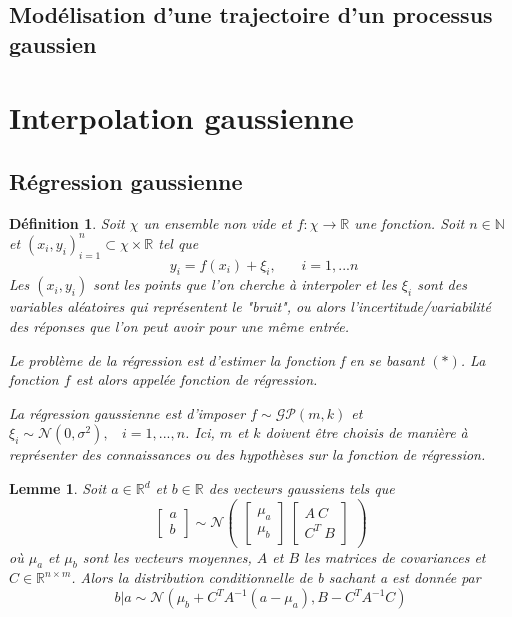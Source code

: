 \documentclass[a4paper,12pt]{article}
\newtheorem{definition}{Définition}
\newtheorem{lemma}{Lemme}
\begin{document}
\subsection{Modélisation d'une trajectoire d'un processus gaussien}

\section{Interpolation gaussienne}

\subsection{Régression gaussienne}

\begin{definition}
    Soit $\chi$ un ensemble non vide et $f:\chi\to\mathbb{R}$ une fonction.
    Soit $n\in\mathbb{N}$ et $(x_i,y_i)_{i=1}^n\subset\chi\times\mathbb{R}$ tel que
    $$ ~~ y_i=f(x_i)+\xi_i,~~~~~~~~i=1,...n$$ 
    Les $(x_i,y_i)$ sont les points que l'on cherche à interpoler
    et les $\xi_i$ sont des variables aléatoires qui représentent le "bruit", 
    ou alors l'incertitude/variabilité des réponses que l'on peut avoir pour une même entrée.

    Le problème de la régression est d'estimer la fonction f en se basant $(*)$. 
    La fonction $f$ est alors appelée fonction de régression.

    La régression gaussienne est d'imposer $f\sim\mathcal{GP}(m,k)$ et $\xi_i\sim\mathcal{N}(0,\sigma^2),~~~~i=1,...,n$. 
    Ici, $m$ et $k$ doivent être choisis de manière à représenter des connaissances 
    ou des hypothèses sur la fonction de régression.
\end{definition}

\begin{lemma}
    Soit $a\in\mathbb{R}^d$ et $b\in\mathbb{R}$ des vecteurs gaussiens tels que 
$$
\begin{bmatrix} a \\ b \end{bmatrix} \sim \mathcal{N} \begin{pmatrix} \begin{bmatrix} \mu_a \\ \mu_b \end{bmatrix} \ \begin{bmatrix} A \ C \\ C^T \ B \end{bmatrix} \end{pmatrix}
$$
où $\mu_a$ et $\mu_b$ sont les vecteurs moyennes, $A$ et $B$ les matrices de covariances et $C\in\mathbb{R}^{n\times m}$.
Alors la distribution conditionnelle de b sachant a est donnée par
$$ b|a \sim \mathcal{N}(\mu_b+C^TA^{-1}(a-\mu_a),B-C^TA^{-1}C) $$
\end{lemma}
\end{document}
